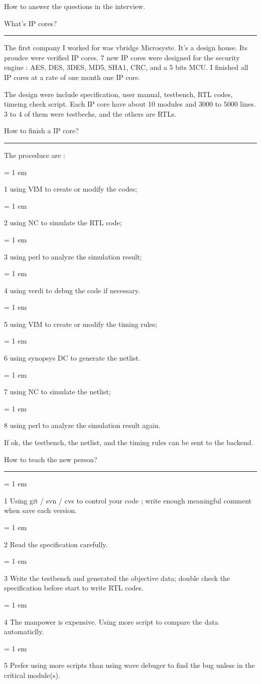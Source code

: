 

\centerline{ \FFaa
How to answer the questions in the interview.
}

{ \medbreak } { \FFcc
What's IP cores?
} { \smallbreak } {\par\noindent\hrule} { \smallbreak }

    The first company I worked for was vbridge Microsyste.
It's a design house. Its proudce were verified IP cores.
7 new IP cores were designed for the security engine : 
AES, DES, 3DES, MD5, SHA1, CRC, and a 5 bits MCU.
I finished all IP cores at a rate of one month one IP core.

The design were include specification, user manual, testbench, 
RTL codes, timeing check script. 
Each IP core have about 10 modules and 3000 to 5000 lines.
3 to 4 of them were testbechs, and the others are RTLs.


{ \medbreak } { \FFcc
How to finish a IP core?
} { \smallbreak } {\par\noindent\hrule} { \smallbreak }

The proceduce are : 

{ \parindent = 1 em \item{1} 
using VIM to create or modify the codes;
}
{ \parindent = 1 em \item{2} 
using NC to simulate the RTL code;
}
{ \parindent = 1 em \item{3} 
using perl to analyze the simulation result;
}
{ \parindent = 1 em \item{4} 
using verdi to debug the code if necessary.
}
{ \parindent = 1 em \item{5} 
using VIM to create or modify the timing rules;
}
{ \parindent = 1 em \item{6} 
using synopsys DC to generate the netlist.
}
{ \parindent = 1 em \item{7} 
using NC to simulate the netlist;
}
{ \parindent = 1 em \item{8} 
using perl to analyze the simulation result again.
}

If ok, the testbench, the netlist, and the timing rules can be sent to the backend.



{ \medbreak } { \FFcc
How to teach the new person?
} { \smallbreak } {\par\noindent\hrule} { \smallbreak }

{ \parindent = 1 em \item{1} 
Using git / svn / cvs to control your code ; write enough meaningful comment when save each version.
}
{ \parindent = 1 em \item{2} 
Read the specification carefully.
}
{ \parindent = 1 em \item{3} 
Write the testbench and generated the objective data; double check the specification before start to write RTL codes.
}
{ \parindent = 1 em \item{4} 
The manpower is expensive. Using more script to compare the data automaticlly. 
}
{ \parindent = 1 em \item{5} 
Prefer using more scripts than using wave debuger to find the bug 
unless in the critical module(s).
}

\bye
